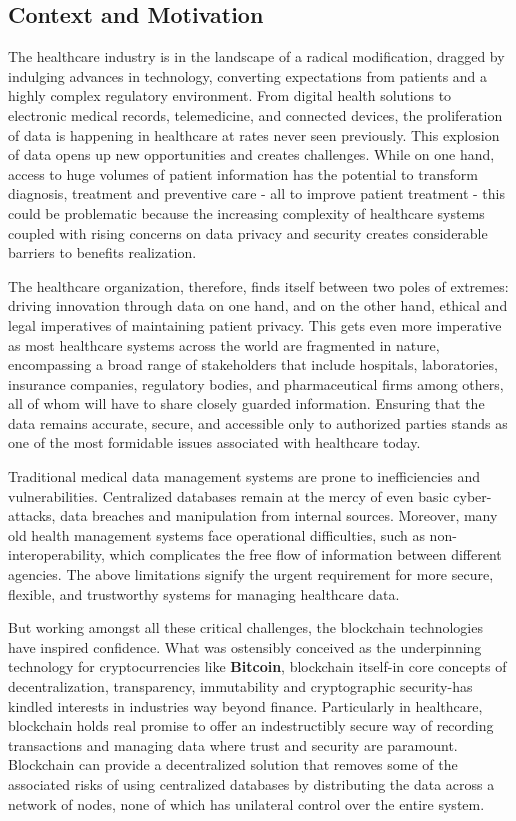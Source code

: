 \subsection{Context and Motivation}
The healthcare industry is in the landscape of a radical modification, dragged by indulging advances in technology, converting expectations from patients and a highly complex regulatory environment. From digital health solutions to electronic medical records, telemedicine, and connected devices, the proliferation of data is happening in healthcare at rates never seen previously. This explosion of data opens up new opportunities and creates challenges. While on one hand, access to huge volumes of patient information has the potential to transform diagnosis, treatment and preventive care - all to improve patient treatment - this could be problematic because the increasing complexity of healthcare systems coupled with rising concerns on data privacy and security creates considerable barriers to benefits realization.

The healthcare organization, therefore, finds itself between two poles of extremes: driving innovation through data on one hand, and on the other hand, ethical and legal imperatives of maintaining patient privacy. This gets even more imperative as most healthcare systems across the world are fragmented in nature, encompassing a broad range of stakeholders that include hospitals, laboratories, insurance companies, regulatory bodies, and pharmaceutical firms among others, all of whom will have to share closely guarded information. Ensuring that the data remains accurate, secure, and accessible only to authorized parties stands as one of the most formidable issues associated with healthcare today.

Traditional medical data management systems are prone to inefficiencies and vulnerabilities. Centralized databases remain at the mercy of even basic cyber-attacks, data breaches and manipulation from internal sources. Moreover, many old health management systems face operational difficulties, such as non-interoperability, which complicates the free flow of information between different agencies. The above limitations signify the urgent requirement for more secure, flexible, and trustworthy systems for managing healthcare data.

But working amongst all these critical challenges, the blockchain technologies have inspired confidence. What was ostensibly conceived as the underpinning technology for cryptocurrencies like \textbf{Bitcoin}, blockchain itself-in core concepts of decentralization, transparency, immutability  and cryptographic security-has kindled interests in industries way beyond finance. Particularly in healthcare, blockchain holds real promise to offer an indestructibly secure way of recording transactions and managing data where trust and security are paramount. Blockchain can provide a decentralized solution that removes some of the associated risks of using centralized databases by distributing the data across a network of nodes, none of which has unilateral control over the entire system.

